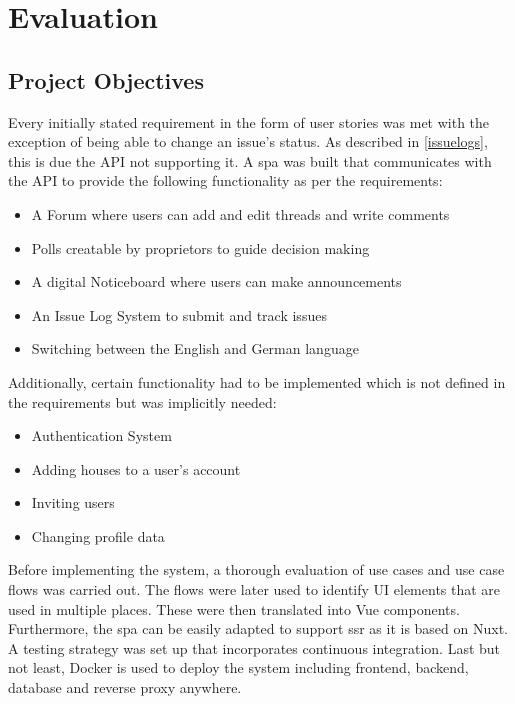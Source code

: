 \chapter{Evaluation}

\section{Project Objectives}
Every initially stated requirement in the form of user stories was met with the exception of being able to change an issue's status. As described in \autoref{issuelogs}, this is due the API not supporting it. A \acrlong{spa} was built that communicates with the API to provide the following functionality as per the requirements:

\begin{itemize}
    \item A Forum where users can add and edit threads and write comments
    \item Polls creatable by proprietors to guide decision making
    \item A digital Noticeboard where users can make announcements    
    \item An Issue Log System to submit and track issues
    \item Switching between the English and German language
\end{itemize}

Additionally, certain functionality had to be implemented which is not defined in the requirements but was implicitly needed:  
\begin{itemize}
    \item Authentication System
    \item Adding houses to a user's account
    \item Inviting users    
    \item Changing profile data
\end{itemize}

Before implementing the system, a thorough evaluation of use cases and use case flows was carried out. The flows were later used to identify UI elements that are used in multiple places. These were then translated into Vue components. Furthermore, the \acrshort{spa} can be easily adapted to support \acrlong{ssr} as it is based on Nuxt. A testing strategy was set up that incorporates continuous integration. Last but not least, Docker is used to deploy the system including frontend, backend, database and reverse proxy anywhere.

